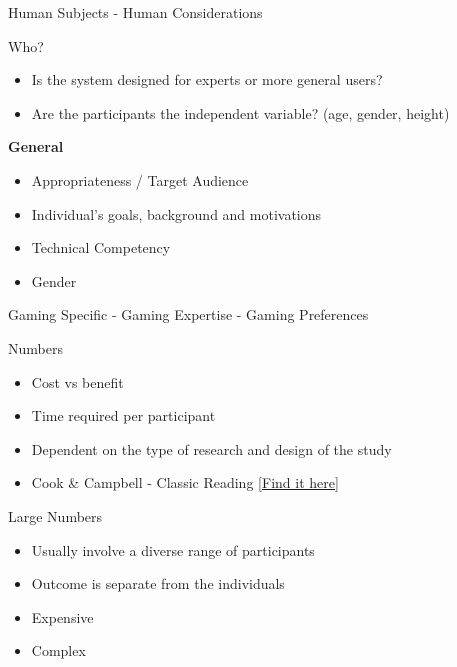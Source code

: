 \documentclass[ignorenonframetext,]{beamer}
\providecommand{\tightlist}{%
  \setlength{\itemsep}{0pt}\setlength{\parskip}{0pt}}
\begin{document}
\begin{frame}{Human Subjects - Human Considerations}
\protect\hypertarget{human-subjects---human-considerations}{}

\begin{block}{Who?}

\begin{itemize}
\tightlist
\item
  Is the system designed for experts or more general users?
\item
  Are the participants the independent variable? (age, gender, height)
\end{itemize}

\textbf{General}

\begin{itemize}
\tightlist
\item
  Appropriateness / Target Audience
\item
  Individual's goals, background and motivations
\item
  Technical Competency
\item
  Gender
\end{itemize}

Gaming Specific - Gaming Expertise - Gaming Preferences

\end{block}

\begin{block}{Numbers}

\begin{itemize}
\tightlist
\item
  Cost vs benefit
\item
  Time required per participant
\item
  Dependent on the type of research and design of the study
\item
  Cook \& Campbell - Classic Reading
  \href{https://moodle2.units.it/pluginfile.php/132646/mod_resource/content/1/Estratto_ShadishCookCampbellExperimental2002.pdf}{{[}Find
  it here{]}}
\end{itemize}

\end{block}

\begin{block}{Large Numbers}

\begin{itemize}
\tightlist
\item
  Usually involve a diverse range of participants
\item
  Outcome is separate from the individuals
\item
  Expensive
\item
  Complex
\end{itemize}


\end{block}
\end{frame}
\end{document}
